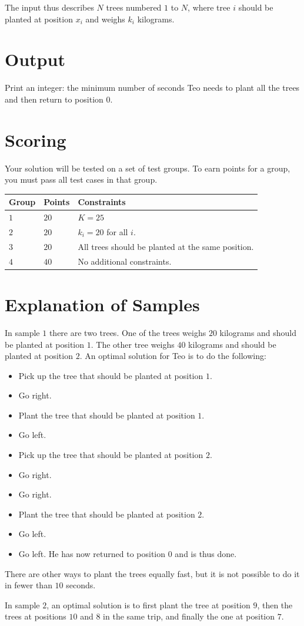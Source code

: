 The input thus describes $N$ trees numbered $1$ to $N$, where tree $i$ should be planted at
position $x_i$ and weighs $k_i$ kilograms.

\section*{Output}
Print an integer: the minimum number of seconds Teo needs to plant all the trees and then
return to position $0$.

\section*{Scoring}
Your solution will be tested on a set of test groups.
To earn points for a group, you must pass all test cases in that group.

\noindent
\begin{tabular}{| l | l | p{12cm} |}
  \hline
  \textbf{Group} & \textbf{Points} & \textbf{Constraints} \\ \hline
  $1$    & $20$  & $K = 25$ \\ \hline
  $2$    & $20$  & $k_i = 20$ for all $i$. \\ \hline
  $3$    & $20$  & All trees should be planted at the same position. \\ \hline
  $4$    & $40$  & No additional constraints. \\ \hline
\end{tabular}

\section*{Explanation of Samples}
In sample $1$ there are two trees.
One of the trees weighs $20$ kilograms and should be planted at position $1$.
The other tree weighs $40$ kilograms and should be planted at position $2$.
An optimal solution for Teo is to do the following:
\begin{itemize}
  \item Pick up the tree that should be planted at position $1$.
  \item Go right.
  \item Plant the tree that should be planted at position $1$.
  \item Go left.
  \item Pick up the tree that should be planted at position $2$.
  \item Go right.
  \item Go right.
  \item Plant the tree that should be planted at position $2$.
  \item Go left.
  \item Go left. He has now returned to position $0$ and is thus done.
\end{itemize}
There are other ways to plant the trees equally fast, but it is not possible to do it in
fewer than $10$ seconds.

In sample $2$, an optimal solution is to first plant the tree at position $9$, then the
trees at positions $10$ and $8$ in the same trip, and finally the one at position $7$.
